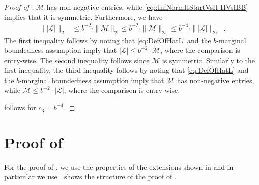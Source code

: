 \documentclass[11pt,reqno]{amsart}
\numberwithin{equation}{section}
\newcommand{\cL}{{\mathcal{L}}}
\newcommand{\cM}{{\mathcal{M}}}
\newcommand{\amethyst}[1]{{\color{amethyst}#1} }
\newcommand{\blue}[1]{{\color{blue}#1}}
\newcommand{\bluepigment}[1]{{\color{blue(pigment)}#1}}
\newcommand{\byzantine}[1]{{\color{byzantine}#1}}
\newcommand{\cadmiumgreen}[1]{{\color{cadmiumgreen}#1}}
\newcommand{\darkmagenta}[1]{{\color{darkmagenta}#1}}
\newcommand{\goldenbrown}[1]{{\color{goldenbrown}#1}}
\newcommand{\iris}[1]{{\color{iris}#1}}
\newcommand{\red}[1]{{\color{red}#1}}
\newcommand{\rosegold}[1]{{\color{rosegold}#1}}
\newcommand{\pfs}{\darkmagenta{s}}
\newcommand{\norm}[2]{\goldenbrown{\|} #1 \goldenbrown{\|}_{#2}}
\newcommand{\abs}[1]{\blue{|}#1\blue{|}}
\newcommand{\spreadpoint}{\newpage}
\newcommand{\LastReviewG}[1]{{\color{magenta}\hspace{.2cm} [Rev: \textrm{#1} - \bluepigment{G} ] \hspace{.2cm}}}
\renewcommand{\LastReviewG}[1]{}
\renewcommand{\spreadpoint}{}
\renewcommand{\amethyst}[1]{#1}
\renewcommand{\blue}[1]{#1}
\renewcommand{\bluepigment}[1]{#1}
\renewcommand{\byzantine}[1]{#1}
\renewcommand{\cadmiumgreen}[1]{#1}
\renewcommand{\darkmagenta}[1]{#1}
\renewcommand{\goldenbrown}[1]{#1}
\renewcommand{\iris}[1]{#1}
\renewcommand{\red}[1]{#1}
\renewcommand{\rosegold}[1]{#1}
\newcommand{\kP}{\goldenbrown{P}}
\newcommand{\kQ}{\amethyst{Q}}
\renewcommand{\kP}{P}
\renewcommand{\kQ}{Q}
\newcommand{\ExtdInfMatrix}{\rosegold{\cL}}
\begin{document}
\begin{proof}[Proof of ]
$\cM$ has non-negative entries, while \eqref{eq::InfNormHStartVsH-HVsIBB} implies that it is symmetric. 
Furthermore, we have 
\begin{align}\label{eq:L2BoundInflNoNuMatrixNoMaxB}
\norm{ \abs{\ExtdInfMatrix}}{2}   &\leq b^{-2} \cdot \norm{  \cM }{2} 
 \leq b^{-2} \cdot \norm{ \cM}{2\pfs} 
 \leq b^{-4} \cdot \norm{ \abs{\ExtdInfMatrix}}{2\pfs} \enspace. 
\end{align}
The first inequality follows by noting that   \eqref{eq:DefOfHatL} and the $b$-marginal boundedness assumption imply 
that $\abs{\ExtdInfMatrix} \leq b^{-2} \cdot \cM$, where the comparison is entry-wise.  The second inequality follows since 
$\cM$ is symmetric. Similarly to the first inequality, the third inequality follows by noting that  \eqref{eq:DefOfHatL} and the $b$-marginal
boundedness assumption imply that $\cM$ has non-negative entries, while  $\cM \leq b^{-2}\cdot \abs{\ExtdInfMatrix}$, 
where the comparison is entry-wise. 

 follows for $c_3=b^{-4}$.
\end{proof}

\spreadpoint


\newcommand{\ExtdInfMatrixL}{\mathcal{D}} 

\section{Proof of  \LastReviewG{2025-04-03} } \label{sec:thrm:InfNormBoundHConj}


\begin{figure}[omitted: a diagram of this paper's results, not reproduced here]\label{fig:Strct4thrm:InfNormBoundHConj}\end{figure}






For the proof of ,  we use the properties of the extensions shown in  
and in particular we use .
%
 shows the structure of the proof of .





\newcommand{\TPQ}{ \cadmiumgreen{T_{\kP,\kQ}} }
\newcommand{\TPP}{ \byzantine{\overline{T}}}
\newcommand{\TAdj}{\red{\UpZ}}


\newcommand{\vecF}{\upf}
\newcommand{\vecG}{\upg}
\newcommand{\vecK}{\upk}
\newcommand{\vtest}{\iris{{\bf q}}}
\end{document}
